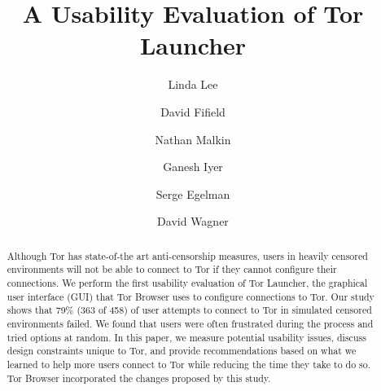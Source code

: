 \documentclass[USenglish,oneside,twocolumn]{article}
\begin{document}
  \author*[1]{Linda Lee}

  \author[2]{David Fifield}

  \author[3]{Nathan Malkin}

  \author[4]{Ganesh Iyer}

  \author[5]{Serge Egelman}
  
  \author[6]{David Wagner}




  
   

  \title{\huge A Usability Evaluation of Tor Launcher}



  \begin{abstract}
{
Although Tor has state-of-the art anti-censorship measures, users in heavily censored environments will not be able to connect to Tor if they cannot configure their connections.
We perform the first usability evaluation of Tor Launcher, the graphical user interface (GUI) that Tor Browser uses to configure connections to Tor.
Our study shows that 79\% (363 of 458) of user attempts to connect to Tor in simulated censored environments failed. We found that users were often frustrated during the process and tried options at random.
In this paper, we measure potential usability issues, discuss design constraints unique to Tor, and provide recommendations based on what we learned to help more users connect to Tor while reducing the time they take to do so. Tor Browser incorporated the changes proposed by this study.
}
\end{abstract}
\end{document}
